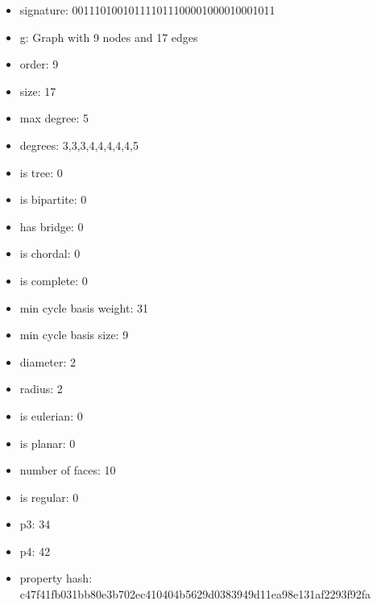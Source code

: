 \newpage
\begin{figure}
\end{figure}
\begin{itemize}
\item signature: 001110100101111011100001000010001011
\item g: Graph with 9 nodes and 17 edges
\item order: 9
\item size: 17
\item max degree: 5
\item degrees: 3,3,3,4,4,4,4,4,5
\item is tree: 0
\item is bipartite: 0
\item has bridge: 0
\item is chordal: 0
\item is complete: 0
\item min cycle basis weight: 31
\item min cycle basis size: 9
\item diameter: 2
\item radius: 2
\item is eulerian: 0
\item is planar: 0
\item number of faces: 10
\item is regular: 0
\item p3: 34
\item p4: 42
\item property hash: c47f41fb031bb80e3b702ec410404b5629d0383949d11ea98e131af2293f92fa
\end{itemize}
